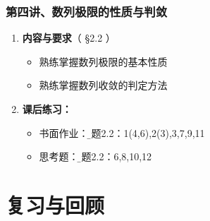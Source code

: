 \begin{frame}
	\frametitle{第四讲、数列极限的性质与判敛}
	\linespread{1.5}
	\begin{enumerate}
	  \item {\bf 内容与要求}{\color{blue}（ \S2.2 ）}
	  \begin{itemize}
	    \item 熟练掌握数列极限的基本性质
	    \item 熟练掌握数列收敛的判定方法
	  \vspace{1em}
	  \end{itemize}
	  \item {\bf 课后练习：}
	  \begin{itemize}
	    \item 书面作业：{\b 习题2.2：1(4,6),2(3),3,7,9,11}
	    \item 思考题：{\b 习题2.2：6,8,10,12}
	  \end{itemize}
	\end{enumerate}
\end{frame}

\section{复习与回顾}

